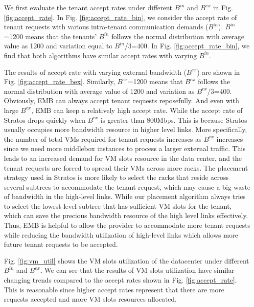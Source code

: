\documentclass[review]{elsarticle}
\begin{document}
We first evaluate the tenant accept rates under different $B^{in}$ and $B^{ex}$ in Fig. \ref{fig:accept_rate}.
In Fig. \ref{fig:accept_rate_bin}, we consider 
the accept rate of tenant requests with various intra-tenant communication demands ($B^{in}$). $B^{in}$=1200 means that the tenants’ $B^{in}$ follows the normal distribution with average value as 1200 and variation equal to $B^{in}$/3=400. In Fig. \ref{fig:accept_rate_bin}, we find that both algorithms have similar accept rates with varying $B^{in}$. 

The results of accept rate with varying external bandwidth ($B^{ex}$) are shown in Fig. \ref{fig:accept_rate_bex}. Similarly, $B^{ex}$=1200 means that $B^{ex}$ follows the normal distribution with average value of 1200 and variation as $B^{ex}$/3=400. Obviously, EMB can always accept tenant requests reposefully. And even with large $B^{ex}$, EMB can keep a relatively high accept rate. While the accept rate of Stratos drops quickly when $B^{ex}$ is greater than 800Mbps. This is because Stratos usually occupies more bandwidth resource in higher level links. More specifically, the number of total VMs required for tenant requests increases as $B^{ex}$ increases since we need more middlebox instances to process a larger external traffic. This leads to an increased demand for VM slots resource in the data center, and the tenant requests are forced to spread their VMs across more racks. The placement strategy used in Stratos is more likely to select the racks that reside across several subtrees to accommodate the tenant request, which may cause a big waste of bandwidth in the high-level links. While our placement algorithm always tries to select the lowest-level subtree that has sufficient VM slots for the tenant, which can save the precious bandwidth resource of the high level links effectively. Thus, EMB is helpful to allow the provider to accommodate more tenant requests while reducing the bandwidth utilization of high-level links which allows more future tenant requests to be accepted.

Fig. \ref{fig:vm_util} shows the VM slots utilization of the datacenter under different $B^{in}$ and $B^{ex}$. We can see that the results of VM slots utilization have similar changing trends compared to the accept rates shown in Fig. \ref{fig:accept_rate}.
This is reasonable since higher accept rates represent that there are more requests accepted and more VM slots resources allocated.  
\end{document}
